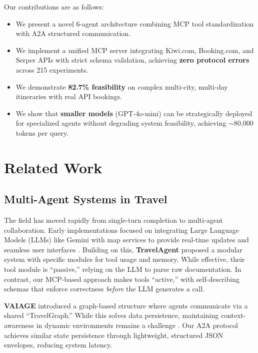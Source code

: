 \documentclass[conference]{IEEEtran}
\begin{document}
Our contributions are as follows:
\begin{itemize}
    \item We present a novel 6-agent architecture combining MCP tool standardization with A2A structured communication.
    \item We implement a unified MCP server integrating Kiwi.com, Booking.com, and Serper APIs with strict schema validation, achieving \textbf{zero protocol errors} across 215 experiments.
    \item We demonstrate \textbf{82.7\% feasibility} on complex multi-city, multi-day itineraries with real API bookings.
    \item We show that \textbf{smaller models} (GPT-4o-mini) can be strategically deployed for specialized agents without degrading system feasibility, achieving $\sim$80,000 tokens per query.
\end{itemize}

\section{Related Work}

\subsection{Multi-Agent Systems in Travel}
The field has moved rapidly from single-turn completion to multi-agent collaboration. Early implementations focused on integrating Large Language Models (LLMs) like Gemini with map services to provide real-time updates and seamless user interfaces \cite{ravindra2025seamless}. Building on this, \textbf{TravelAgent} \cite{chen2024travelagent} proposed a modular system with specific modules for tool usage and memory. While effective, their tool module is ``passive,'' relying on the LLM to parse raw documentation. In contrast, our MCP-based approach makes tools ``active,'' with self-describing schemas that enforce correctness \textit{before} the LLM generates a call.

\textbf{VAIAGE} \cite{ge2025vaiage} introduced a graph-based structure where agents communicate via a shared ``TravelGraph.'' While this solves data persistence, maintaining context-awareness in dynamic environments remains a challenge \cite{anitha2025intelligent}. Our A2A protocol achieves similar state persistence through lightweight, structured JSON envelopes, reducing system latency.
\end{document}

